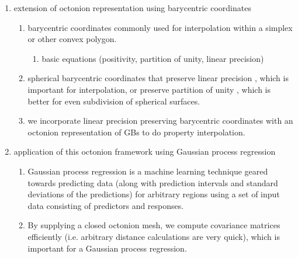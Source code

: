 \begin{enumerate}
    \item extension of octonion representation using barycentric coordinates
    \begin{enumerate}
        \item barycentric coordinates commonly used for interpolation within a simplex or other convex polygon.
        \begin{enumerate}
            \item basic equations (positivity, partition of unity, linear precision) \cite{Langer2006SphericalCoordinates}
        \end{enumerate}
        \item spherical barycentric coordinates that preserve linear precision \cite{Langer2006SphericalCoordinates}, which is important for interpolation, or preserve partition of unity \cite{Lei2020ASystems}, which is better for even subdivision of spherical surfaces.
        \item we incorporate linear precision preserving barycentric coordinates with an octonion representation of GBs to do property interpolation.
    \end{enumerate}
    \item application of this octonion framework using Gaussian process regression
    \begin{enumerate}
        \item Gaussian process regression is a machine learning technique geared towards predicting data (along with prediction intervals and standard deviations of the predictions) for arbitrary regions using a set of input data consisting of predictors and responses.
        \item By supplying a closed octonion mesh, we compute covariance matrices efficiently (i.e. arbitrary distance calculations are very quick), which is important for a Gaussian process regression.
    \end{enumerate}
\end{enumerate}

